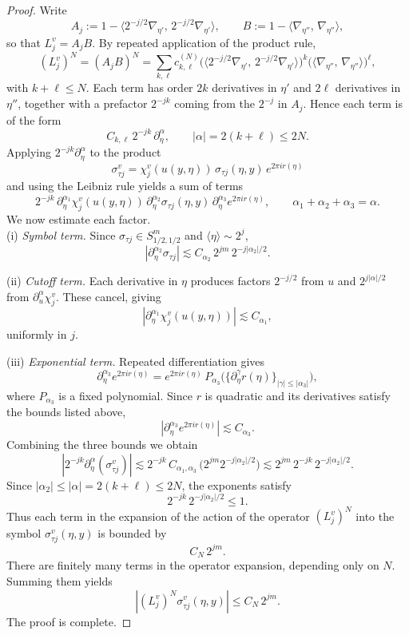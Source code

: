 \documentclass[12pt, reqno]{amsart}
\theoremstyle{definition}
\theoremstyle{remark}
\numberwithin{equation}{section}
\begin{document}
\begin{proof}
 Write
\[
A_j := 1 - \langle 2^{-j/2}\nabla_{\eta'},\,2^{-j/2}\nabla_{\eta'}\rangle,
\qquad
B := 1 - \langle\nabla_{\eta''},\,\nabla_{\eta''}\rangle,
\]
so that $L_j^v = A_j B$.
By repeated application of the product rule,
\[
(L_j^v)^N = (A_jB)^N
= \sum_{k,\ell} c_{k,\ell}^{(N)}
\Big(\langle 2^{-j/2}\nabla_{\eta'},\,2^{-j/2}\nabla_{\eta'}\rangle\Big)^k
\Big(\langle\nabla_{\eta''},\,\nabla_{\eta''}\rangle\Big)^\ell,
\]
with $k+\ell \le N$.  
Each term has order $2k$ derivatives in $\eta'$ and $2\ell$ derivatives in $\eta''$,
together with a prefactor $2^{-jk}$ coming from the $2^{-j}$ in $A_j$.
Hence each term is of the form
\[
C_{k,\ell}\,2^{-jk}\,\partial_\eta^\alpha,
\qquad |\alpha|=2(k+\ell)\le 2N.
\]
Applying $2^{-jk}\partial_\eta^\alpha$ to the product
\[
\sigma_{\tau j}^v
= \chi_j^v(u(y,\eta))\,\sigma_{\tau j}(\eta,y)\,e^{2\pi i r(\eta)}
\]
and using the Leibniz rule yields a sum of terms
\[
2^{-jk}\,
\partial_\eta^{\alpha_1}\chi_j^v(u(y,\eta))\,
\partial_\eta^{\alpha_2}\sigma_{\tau j}(\eta,y)\,
\partial_\eta^{\alpha_3} e^{2\pi i r(\eta)},
\qquad
\alpha_1+\alpha_2+\alpha_3=\alpha.
\]
We now estimate each factor.\\
\smallskip\noindent
(i) \emph{Symbol term.}  
Since $\sigma_{\tau j}\in S^m_{1/2,1/2}$ and $\langle\eta\rangle\sim 2^j$,
\[
|\partial_\eta^{\alpha_2}\sigma_{\tau j}|\lesssim 
C_{\alpha_2}\,2^{jm}\,2^{-j|\alpha_2|/2}.
\]

\smallskip\noindent
(ii) \emph{Cutoff term.}  
Each derivative in $\eta$ produces factors $2^{-j/2}$ from $u$ and
$2^{j|\alpha|/2}$ from $\partial_u^\alpha\chi_j^v$.  
These cancel, giving
\[
|\partial_\eta^{\alpha_1}\chi_j^v(u(y,\eta))|\lesssim C_{\alpha_1},
\]
uniformly in $j$.

\smallskip\noindent
(iii) \emph{Exponential term.}  
Repeated differentiation gives
\[
\partial_\eta^{\alpha_3} e^{2\pi i r(\eta)}
= e^{2\pi i r(\eta)}\,P_{\alpha_3}\big(
\{\partial_\eta^\gamma r(\eta)\}_{|\gamma|\le |\alpha_3|}
\big),
\]
where $P_{\alpha_3}$ is a fixed polynomial.
Since $r$ is quadratic and its derivatives satisfy the bounds listed above,
\[
|\partial_\eta^{\alpha_3} e^{2\pi i r(\eta)}|
\lesssim C_{\alpha_3}.
\]
Combining the three bounds we obtain
\[
|2^{-jk}\partial_\eta^\alpha(\sigma_{\tau j}^v)|
\lesssim 
2^{-jk}\,C_{\alpha_1,\alpha_3}\,
\big(2^{jm}2^{-j|\alpha_2|/2}\big)
\lesssim
2^{jm}\,2^{-jk}\,2^{-j|\alpha_2|/2}.
\]
Since $|\alpha_2|\le|\alpha|=2(k+\ell)\le2N$, the exponents satisfy
\[
2^{-jk}\,2^{-j|\alpha_2|/2} \leq 1.
\]
Thus each term in the expansion of the action of the operator $(L_j^v)^N$ into the symbol $\sigma_{\tau j}^v(\eta,y)$ is bounded by
\[
C_N\,2^{jm}.
\]
There are finitely many terms in the operator expansion, depending only on $N$.
Summing them yields
\[
|(L_j^v)^N \sigma_{\tau j}^v(\eta,y)|
\le C_N\,2^{jm}.
\] The proof is complete.
\end{proof}
\end{document}
